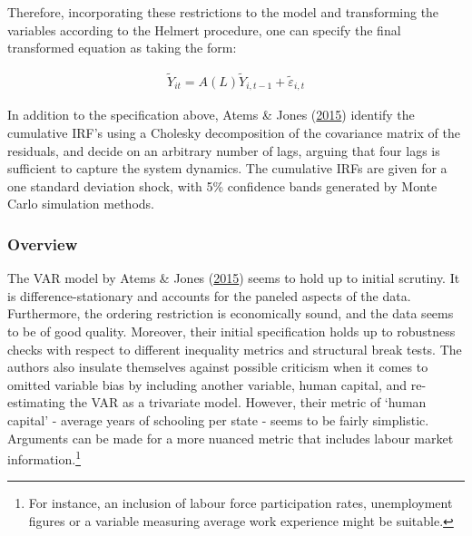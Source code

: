 \documentclass[11pt,preprint, authoryear]{elsarticle}
\numberwithin{equation}{section}
\numberwithin{figure}{section}
\numberwithin{table}{section}
\let\rmarkdownfootnote\footnote%
\def\footnote{\protect\rmarkdownfootnote}
\begin{document}
Therefore, incorporating these restrictions to the model and
transforming the variables according to the Helmert procedure, one can
specify the final transformed equation as taking the form:

\begin{align}\tag{2}
\tilde{Y}_{it} = A(L) \tilde{Y}_{i, t-1} + \tilde{\varepsilon}_{i,t} \label{eq2}
\end{align}

In addition to the specification above, Atems \& Jones
(\protect\hyperlink{ref-atems}{2015}) identify the cumulative IRF's
using a Cholesky decomposition of the covariance matrix of the
residuals, and decide on an arbitrary number of lags, arguing that four
lags is sufficient to capture the system dynamics. The cumulative IRFs
are given for a one standard deviation shock, with 5\% confidence bands
generated by Monte Carlo simulation methods.

\hypertarget{overview}{%
\subsubsection*{Overview}\label{overview}}

The VAR model by Atems \& Jones (\protect\hyperlink{ref-atems}{2015})
seems to hold up to initial scrutiny. It is difference-stationary and
accounts for the paneled aspects of the data. Furthermore, the ordering
restriction is economically sound, and the data seems to be of good
quality. Moreover, their initial specification holds up to robustness
checks with respect to different inequality metrics and structural break
tests. The authors also insulate themselves against possible criticism
when it comes to omitted variable bias by including another variable,
human capital, and re-estimating the VAR as a trivariate model. However,
their metric of `human capital' - average years of schooling per state -
seems to be fairly simplistic. Arguments can be made for a more nuanced
metric that includes labour market information.\footnote{For instance,
  an inclusion of labour force participation rates, unemployment figures
  or a variable measuring average work experience might be suitable.}
\end{document}
